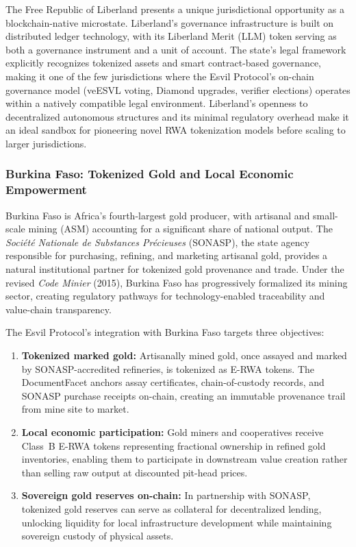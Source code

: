 \documentclass[11pt,a4paper]{article}
\begin{document}
The Free Republic of Liberland presents a unique jurisdictional opportunity as a blockchain-native microstate. Liberland's governance infrastructure is built on distributed ledger technology, with its Liberland Merit (LLM) token serving as both a governance instrument and a unit of account. The state's legal framework explicitly recognizes tokenized assets and smart contract-based governance, making it one of the few jurisdictions where the Esvil Protocol's on-chain governance model (veESVL voting, Diamond upgrades, verifier elections) operates within a natively compatible legal environment. Liberland's openness to decentralized autonomous structures and its minimal regulatory overhead make it an ideal sandbox for pioneering novel RWA tokenization models before scaling to larger jurisdictions.

\subsubsection{Burkina Faso: Tokenized Gold and Local Economic Empowerment}

Burkina Faso is Africa's fourth-largest gold producer, with artisanal and small-scale mining (ASM) accounting for a significant share of national output. The \textit{Soci\'et\'e Nationale de Substances Pr\'ecieuses} (SONASP), the state agency responsible for purchasing, refining, and marketing artisanal gold, provides a natural institutional partner for tokenized gold provenance and trade. Under the revised \textit{Code Minier} (2015), Burkina Faso has progressively formalized its mining sector, creating regulatory pathways for technology-enabled traceability and value-chain transparency.

The Esvil Protocol's integration with Burkina Faso targets three objectives:

\begin{enumerate}[nosep]
    \item \textbf{Tokenized marked gold:} Artisanally mined gold, once assayed and marked by SONASP-accredited refineries, is tokenized as E-RWA tokens. The DocumentFacet anchors assay certificates, chain-of-custody records, and SONASP purchase receipts on-chain, creating an immutable provenance trail from mine site to market.
    \item \textbf{Local economic participation:} Gold miners and cooperatives receive Class~B E-RWA tokens representing fractional ownership in refined gold inventories, enabling them to participate in downstream value creation rather than selling raw output at discounted pit-head prices.
    \item \textbf{Sovereign gold reserves on-chain:} In partnership with SONASP, tokenized gold reserves can serve as collateral for decentralized lending, unlocking liquidity for local infrastructure development while maintaining sovereign custody of physical assets.
\end{enumerate}
\end{document}
